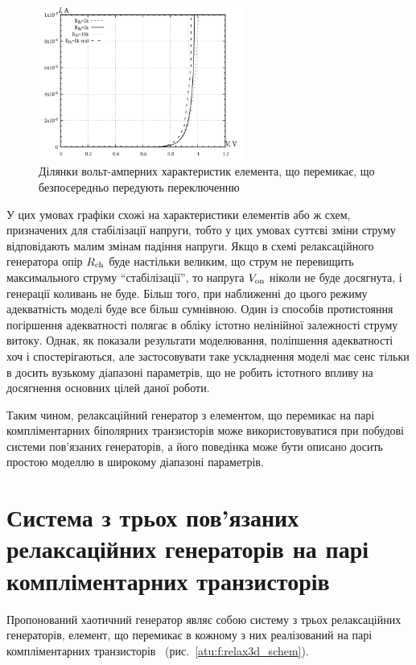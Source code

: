 \begin{figure}[htb!]
  \centerline{\includegraphics[width=0.6\textwidth]{p/relax3d_sw_va_mini.png} }
\caption{Ділянки вольт-амперних характеристик елемента, що перемикає, що безпосередньо передують переключенню}
\label{atu:f:relax3d_sw_vah_mini}
\end{figure}

У цих умовах графіки схожі на характеристики елементів або
ж схем, призначених для стабілізації напруги, тобто у цих
умовах суттєві зміни струму відповідають малим змінам падіння
напруги. Якщо в схемі релаксаційного генератора опір
$R _\mathrm{ch} $ буде настільки великим, що струм не перевищить
максимального струму ``стабілізації'', то напруга
$V _\mathrm{on} $ ніколи не буде досягнута, і генерації коливань не
буде. Більш того, при наближенні до цього режиму адекватність
моделі буде все більш сумнівною. Один із способів протистояння
погіршення адекватності полягає в обліку істотно нелінійної
залежності струму витоку. Однак, як показали результати
моделювання, поліпшення адекватності хоч і спостерігаються,
але застосовувати таке ускладнення моделі має сенс тільки в
досить вузькому діапазоні параметрів, що не робить істотного
впливу на досягнення основних цілей даної роботи.

Таким чином, релаксаційний генератор з  елементом, що перемикає
на парі компліментарних біполярних транзисторів може
використовуватися при побудові системи пов'язаних генераторів,
а його поведінка може бути описано досить простою моделлю в
широкому діапазоні параметрів.



\section{Система з трьох пов'язаних релаксаційних генераторів на парі компліментарних транзисторів}
\label{atu:sec:relax3d}


Пропонований хаотичний генератор являє собою систему з трьох
релаксаційних генераторів, елемент, що перемикає в кожному з
них реалізований на парі компліментарних транзисторів~\cite{atu_st107}
(рис.~\ref{atu:f:relax3d_schem}).

